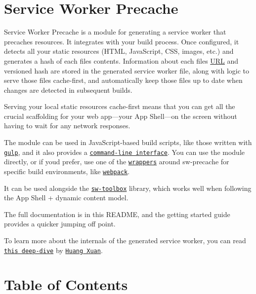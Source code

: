 \section*{Service Worker Precache}

Service Worker Precache is a module for generating a service worker that precaches resources. It integrates with your build process. Once configured, it detects all your static resources (H\+T\+ML, Java\+Script, C\+SS, images, etc.) and generates a hash of each file\textquotesingle{}s contents. Information about each file\textquotesingle{}s \mbox{\hyperlink{namespace_u_r_l}{U\+RL}} and versioned hash are stored in the generated service worker file, along with logic to serve those files cache-\/first, and automatically keep those files up to date when changes are detected in subsequent builds.

Serving your local static resources cache-\/first means that you can get all the crucial scaffolding for your web app—your App Shell—on the screen without having to wait for any network responses.

The module can be used in Java\+Script-\/based build scripts, like those written with \href{http://gulpjs.com/}{\tt {\ttfamily gulp}}, and it also provides a \href{#command-line-interface}{\tt command-\/line interface}. You can use the module directly, or if you\textquotesingle{}d prefer, use one of the \href{#wrappers-and-starter-kits}{\tt wrappers} around {\ttfamily sw-\/precache} for specific build environments, like \href{https://webpack.github.io/}{\tt {\ttfamily webpack}}.

It can be used alongside the \href{https://github.com/GoogleChrome/sw-toolbox}{\tt {\ttfamily sw-\/toolbox}} library, which works well when following the App Shell + dynamic content model.

The full documentation is in this R\+E\+A\+D\+ME, and the getting started guide provides a quicker jumping off point.

To learn more about the internals of the generated service worker, you can read \href{https://medium.com/@Huxpro/how-does-sw-precache-works-2d99c3d3c725}{\tt this deep-\/dive} by \href{https://twitter.com/Huxpro}{\tt Huang Xuan}.

\section*{Table of Contents}


